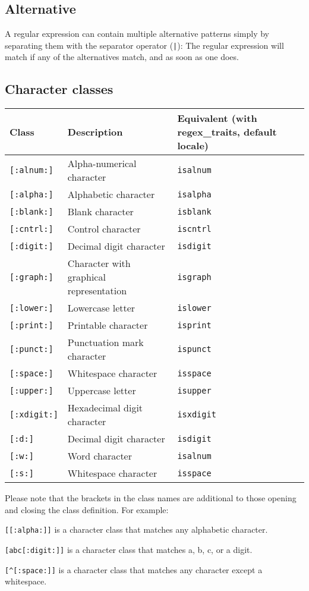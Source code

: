 \subsection{Alternative}
A regular expression can contain multiple alternative patterns simply by separating them with the separator operator (\verb!|!): The regular expression will match if any of the alternatives match, and as soon as one does.
\subsection{Character classes}
\begin{center}
	\begin{tabular}{|M{2cm}|M{10cm}|M{5cm}|}
		\hline
		Class				&	Description								&	Equivalent (with regex\_traits, default locale)\\
		\hline
		\verb![:alnum:]!	&	Alpha-numerical character				&	\verb!isalnum!\\
		\hline
		\verb![:alpha:]!	&	Alphabetic character					&	\verb!isalpha!\\
		\hline
		\verb![:blank:]!	&	Blank character							&	\verb!isblank!\\
		\hline
		\verb![:cntrl:]!	&	Control character						&	\verb!iscntrl!\\
		\hline
		\verb![:digit:]!	&	Decimal digit character					&	\verb!isdigit!\\
		\hline
		\verb![:graph:]!	&	Character with graphical representation	&	\verb!isgraph!\\
		\hline
		\verb![:lower:]!	&	Lowercase letter						&	\verb!islower!\\
		\hline
		\verb![:print:]!	&	Printable character						&	\verb!isprint!\\
		\hline
		\verb![:punct:]!	&	Punctuation mark character				&	\verb!ispunct!\\
		\hline
		\verb![:space:]!	&	Whitespace character					&	\verb!isspace!\\
		\hline
		\verb![:upper:]!	&	Uppercase letter						&	\verb!isupper!\\
		\hline
		\verb![:xdigit:]!	&	Hexadecimal digit character				&	\verb!isxdigit!\\
		\hline
		\verb![:d:]!		&	Decimal digit character					&	\verb!isdigit!\\
		\hline
		\verb![:w:]!		&	Word character							&	\verb!isalnum!\\
		\hline
		\verb![:s:]!		&	Whitespace character					&	\verb!isspace!\\
		\hline
	\end{tabular}
\end{center}
Please note that the brackets in the class names are additional to those opening and closing the class definition. For example:

\verb![[:alpha:]]! is a character class that matches any alphabetic character.

\verb![abc[:digit:]]! is a character class that matches a, b, c, or a digit.

\verb![^[:space:]]! is a character class that matches any character except a whitespace.

